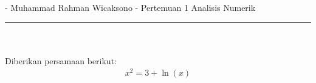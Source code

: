 \documentclass[12pt]{article}
\begin{document}
{}
\newcommand{\unt}{\int\displaylimits}
\newcommand{\jadi}{$\therefore\;$}
\newcommand{\rut}[1]{\sqrt{#1}}
\newcommand{\jgj}{\Leftrightarrow}
\newcommand{\tebal}[1]{\underline{\textbf{#1}}\bigskip}
\newcommand{\infak}{\int\displaylimits^{\infty}_{\infty}}
\newcommand{\lqm}{\lim\displaylimits}

\sloppy

 - Muhammad Rahman Wicaksono - Pertemuan 1 Analisis Numerik\\
\noindent\rule{\textwidth}{0.2pt}\\\\

Diberikan persamaan berikut:
\begin{align*}
        x^2 = 3 + \ln(x) 
\end{align*}

\bigskip
\end{document}
